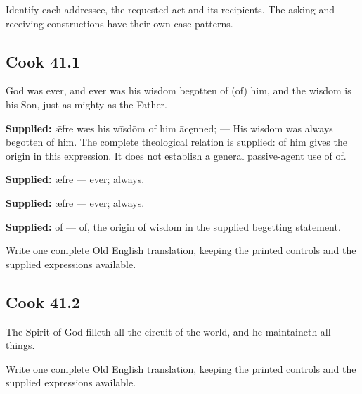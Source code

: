 Identify each addressee, the requested act and its recipients. The asking and receiving constructions have their own case patterns.

\par\begin{minipage}{\linewidth}\raggedright
\subsection*{Cook 41.1}

God was ever, and ever was his wisdom begotten of (of) him, and the wisdom is his Son, just as mighty as the Father.

\end{minipage}\par\addvspace{4pt}

\textbf{Supplied:} ǣfre wæs his wīsdōm of him ācęnned; — His wisdom was always begotten of him. The complete theological relation is supplied: of him gives the origin in this expression. It does not establish a general passive-agent use of of.

\textbf{Supplied:} ǣfre — ever; always.

\textbf{Supplied:} ǣfre — ever; always.

\textbf{Supplied:} of — of, the origin of wisdom in the supplied begetting statement.

Write one complete Old English translation, keeping the printed controls and the supplied expressions available.

\par\begin{minipage}{\linewidth}\raggedright
\subsection*{Cook 41.2}

The Spirit of God filleth all the circuit of the world, and he maintaineth all things.

Write one complete Old English translation, keeping the printed controls and the supplied expressions available.

\end{minipage}\par\addvspace{4pt}

